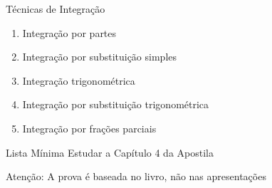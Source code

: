 \documentclass[fleqn,utf8,aspectratio=169,12pt]{beamer}
\begin{document}
\begin{frame}{Técnicas de Integração}
\begin{enumerate}[<+->]
  \setlength\itemsep{1em}
  \item Integração por partes
  \item Integração por substituição simples
  \item Integração trigonométrica
  \item Integração por substituição trigonométrica
  \item Integração por frações parciais
\end{enumerate}
\end{frame}

\begin{frame}{Lista Mínima}
  Estudar a Capítulo 4 da Apostila

  \vfill
  Atenção: A prova é baseada no livro, não nas apresentações
\end{frame}

\end{document}
